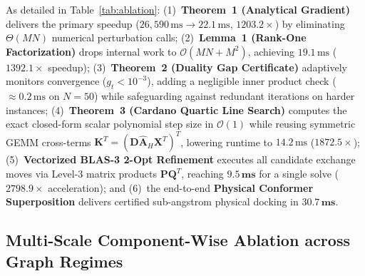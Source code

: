 \documentclass[conference]{IEEEtran}
\begin{document}
As detailed in Table~\ref{tab:ablation}: (1)~\textbf{Theorem~1 (Analytical Gradient)} delivers the primary speedup ($26,590\,\text{ms} \to 22.1\,\text{ms}$, $\mathbf{1203.2\times}$) by eliminating $\Theta(MN)$ numerical perturbation calls; (2)~\textbf{Lemma~1 (Rank-One Factorization)} drops internal work to $\mathcal{O}(MN + M^2)$, achieving $19.1\,\text{ms}$ ($\mathbf{1392.1\times}$ speedup); (3)~\textbf{Theorem~2 (Duality Gap Certificate)} adaptively monitors convergence ($g_t < 10^{-3}$), adding a negligible inner product check ($\approx 0.2\,\text{ms}$ on $N = 50$) while safeguarding against redundant iterations on harder instances; (4)~\textbf{Theorem~3 (Cardano Quartic Line Search)} computes the exact closed-form scalar polynomial step size in $\mathcal{O}(1)$ while reusing symmetric GEMM cross-terms $\mathbf{K}^T = (\mathbf{D}\hat{\mathbf{A}}_H\mathbf{X}^T)^T$, lowering runtime to $14.2\,\text{ms}$ ($\mathbf{1872.5\times}$); (5)~\textbf{Vectorized BLAS-3 2-Opt Refinement} executes all candidate exchange moves via Level-3 matrix products $\mathbf{P}\mathbf{Q}^T$, reaching $\mathbf{9.5\,\text{ms}}$ for a single solve ($\mathbf{2798.9\times}$ acceleration); and (6)~the end-to-end \textbf{Physical Conformer Superposition} delivers certified sub-angstrom physical docking in $\mathbf{30.7\,\text{ms}}$.

\subsection{Multi-Scale Component-Wise Ablation across Graph Regimes}
\end{document}
